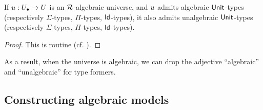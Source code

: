 \begin{proposition}
  If ${u} : {U_\bullet} \to U$ is an $\mathcal{R}$-algebraic universe,
  and ${u}$ admits algebraic $\mathsf{Unit}$-types
  (respectively $\Sigma$-types, $\Pi$-types, $\mathsf{Id}$-types),
  it also admits unalgebraic $\mathsf{Unit}$-types
  (respectively $\Sigma$-types, $\Pi$-types, $\mathsf{Id}$-types).
\end{proposition}
\begin{proof}
  This is routine (cf. \cite{awodey2025, hua2026}).
\end{proof}
As a result, when the universe is algebraic,
we can drop the adjective ``algebraic'' and ``unalgebraic''
for type formers.

\subsection*{Constructing algebraic models}

